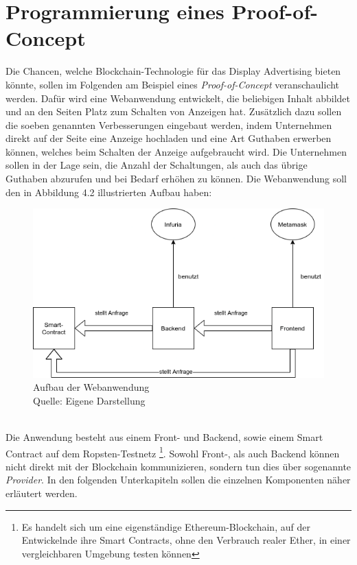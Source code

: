\section{Programmierung eines Proof-of-Concept}
Die Chancen, welche Blockchain-Technologie für das Display Advertising bieten könnte, sollen im Folgenden am Beispiel eines \emph{Proof-of-Concept} veranschaulicht werden. 
Dafür wird eine Webanwendung entwickelt, die beliebigen Inhalt abbildet und an den Seiten Platz zum Schalten von Anzeigen hat. 
Zusätzlich dazu sollen die soeben genannten Verbesserungen eingebaut werden, indem Unternehmen direkt auf der Seite eine Anzeige hochladen und eine Art Guthaben erwerben können, welches beim Schalten der Anzeige aufgebraucht wird. Die Unternehmen sollen in der Lage sein, die Anzahl der Schaltungen, als auch das übrige Guthaben abzurufen und bei Bedarf erhöhen zu können. Die Webanwendung soll den in Abbildung 4.2 illustrierten Aufbau haben:
\begin{figure}[htpb]
	\centering
	\includegraphics[width=\textwidth]{images/aufbau_PoC.png}
	\caption{Aufbau der Webanwendung\\
	Quelle: Eigene Darstellung}
	\label{6braun:fig:aufbau_poc}
\end{figure}\\
Die Anwendung besteht aus einem Front- und Backend, sowie einem Smart Contract auf dem Ropsten-Testnetz \footnote{Es handelt sich um eine eigenständige Ethereum-Blockchain, auf der Entwickelnde ihre Smart Contracts, ohne den Verbrauch realer Ether, in einer vergleichbaren Umgebung testen können}. Sowohl Front-, als auch Backend können nicht direkt mit der Blockchain kommunizieren, sondern tun dies über sogenannte \emph{Provider}. In den folgenden Unterkapiteln sollen die einzelnen Komponenten näher erläutert werden.
